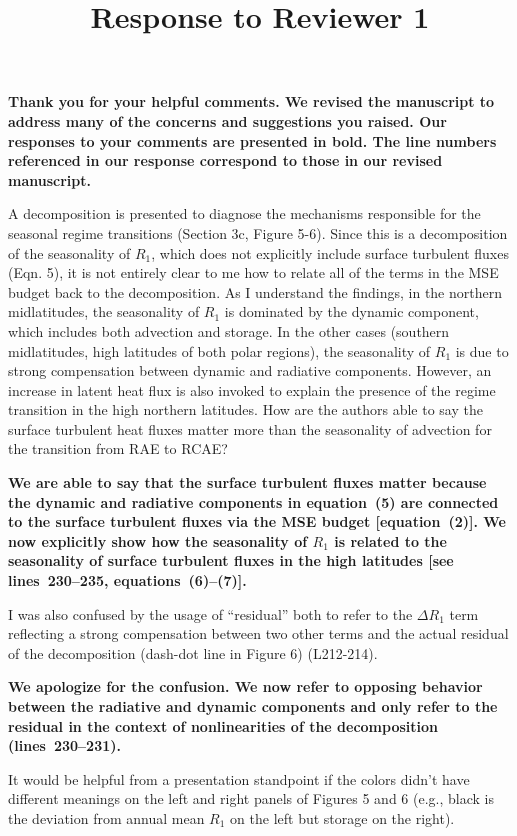\documentclass{article}
\title{\vspace{-2.5cm}Response to Reviewer 1\vspace{-2cm}}
\date{}
\author{}
\begin{document}
\maketitle

\textbf{Thank you for your helpful comments. We revised the manuscript to address many of the concerns and suggestions you raised. Our responses to your comments are presented in bold. The line numbers referenced in our response correspond to those in our revised manuscript.}

A decomposition is presented to diagnose the mechanisms responsible for the seasonal regime transitions (Section 3c, Figure 5-6). Since this is a decomposition of the seasonality of $R_1$, which does not explicitly include surface turbulent fluxes (Eqn. 5), it is not entirely clear to me how to relate all of the terms in the MSE budget back to the decomposition. As I understand the findings, in the northern midlatitudes, the seasonality of $R_1$ is dominated by the dynamic component, which includes both advection and storage. In the other cases (southern midlatitudes, high latitudes of both polar regions), the seasonality of $R_1$ is due to strong compensation between dynamic and radiative components. However, an increase in latent heat flux is also invoked to explain the presence of the regime transition in the high northern latitudes. How are the authors able to say the surface turbulent heat fluxes matter more than the seasonality of advection for the transition from RAE to RCAE?

\textbf{We are able to say that the surface turbulent fluxes matter because the dynamic and radiative components in equation~(5) are connected to the surface turbulent fluxes via the MSE budget [equation~(2)]. We now explicitly show how the seasonality of $R_1$ is related to the seasonality of surface turbulent fluxes in the high latitudes [see lines~230--235, equations~(6)--(7)]. }

I was also confused by the usage of ``residual'' both to refer to the $\Delta R_1$ term reflecting a strong compensation between two other terms and the actual residual of the decomposition (dash-dot line in Figure 6) (L212-214).

\textbf{We apologize for the confusion. We now refer to opposing behavior between the radiative and dynamic components and only refer to the residual in the context of nonlinearities of the decomposition (lines~230--231).}

It would be helpful from a presentation standpoint if the colors didn't have different meanings on the left and right panels of Figures 5 and 6 (e.g., black is the deviation from annual mean $R_1$ on the left but storage on the right).
\end{document}
